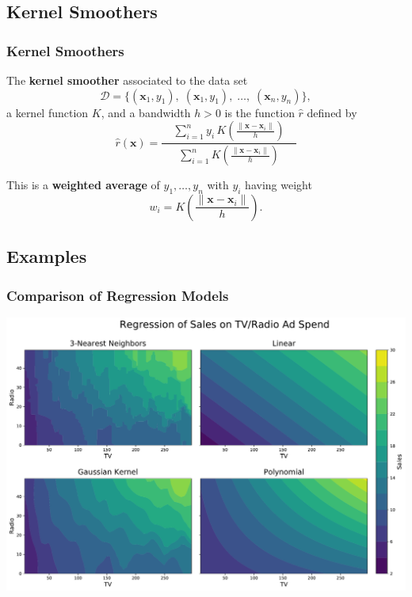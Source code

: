 \documentclass[xcolor={dvipsnames}]{beamer}
\renewcommand{\hat}{\widehat}
\newcommand{\cD}{\mathcal{D}}
\newcommand{\vx}{\mathbf{x}}
\begin{document}
\subsection{Kernel Smoothers}
\begin{frame}
    \frametitle{Kernel Smoothers}
\begin{definition}
    The \textbf{kernel smoother} associated to the data set
    \[
    \cD = \{(\vx_1,y_1),\;(\vx_1,y_1),\;\ldots,\;(\vx_n, y_n)\},
    \]
    a kernel function $K$, and a bandwidth $h>0$ 
    is the function $\hat{r}$ defined by
    \[
        \hat r(\vx) = \frac{\displaystyle\quad\sum_{i=1}^n y_i\,K\left(\frac{\|\vx - \vx_i\|}h\right)\quad}    
        {\displaystyle\sum_{i=1}^n K\left(\frac{\|\vx - \vx_i\|}h\right)}
    \]
\end{definition}

This is a \textbf{weighted average} of $y_1,\ldots,y_n$ with $y_i$ having weight $$w_i=K\left(\dfrac{\|\vx - \vx_i\|}h\right).$$
\end{frame}
\subsection{Examples}
\begin{frame}
    \frametitle{Comparison of Regression Models}
    \includegraphics[scale=0.32]{advertising.pdf}
\end{frame}
\end{document}

